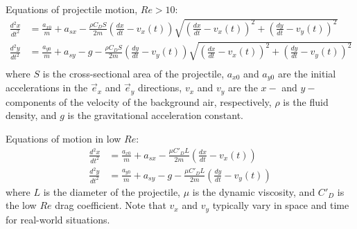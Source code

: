 \documentclass[11pt,letterpaper]{article}
\begin{document}
	
	\newcommand{\bv}[1]{\mathbf{#1}}
	\newcommand{\bsy}{\boldsymbol}
	
	Equations of projectile motion, $Re>10$:
	\begin{align*}
	\frac{d^2 x}{dt^2} &= \frac{a_{x0}}{m}+a_{sx}-\frac{\rho C_D S}{2m}\left(\frac{dx}{dt}-v_x(t)\right)\sqrt{\left(\frac{dx}{dt}-v_x(t)\right)^2+\left(\frac{dy}{dt}-v_y(t)\right)^2}\\
	\frac{d^2 y}{dt^2} &= \frac{a_{y0}}{m}+a_{sy}-g-\frac{\rho C_D S}{2m}\left(\frac{dy}{dt}-v_y(t)\right)\sqrt{\left(\frac{dx}{dt}-v_x(t)\right)^2+\left(\frac{dy}{dt}-v_y(t)\right)^2}\\
	\end{align*}
	where $S$ is the cross-sectional area of the projectile, $a_{x0}$ and $a_{y0}$ are the initial accelerations in the $\overrightarrow{e}_x$ and $\overrightarrow{e}_y$ directions, $v_x$ and $v_y$ are the $x-$ and $y-$components of the velocity of the background air, respectively, $\rho$ is the fluid density, and $g$ is the gravitational acceleration constant.
	
	Equations of motion in low $Re$:
	\begin{align*}
	\frac{d^2 x}{dt^2} &= \frac{a_{x0}}{m}+a_{sx}-\frac{\mu C'_D L}{2m}\left(\frac{dx}{dt}-v_x(t)\right)\\
	\frac{d^2 y}{dt^2} &= \frac{a_{y0}}{m}+a_{sy}-g-\frac{\mu C'_D L}{2m}\left(\frac{dy}{dt}-v_y(t)\right)
	\end{align*}
	where $L$ is the diameter of the projectile, $\mu$ is the dynamic viscosity, and $C'_D$ is the low $Re$ drag coefficient. Note that $v_x$ and $v_y$ typically vary in space and time for real-world situations.
	
	
\end{document}
